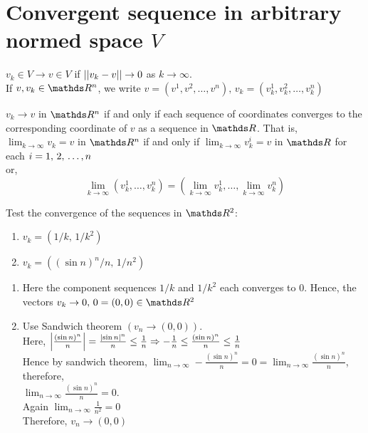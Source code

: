 \documentclass[../main-sheet.tex]{subfiles}
\begin{document}
\section{Convergent sequence in arbitrary normed space $ V $}   
$ v_k\in V\to v\in V $ if $ \left\vert\left\vert v_k-v\right\vert\right\vert\to 0 $ as $ k\to \infty $.\\
If $ v,v_k\in \R^n $, we write $ v=(v^1,v^2,\dots,v^n),\,v_k=(v^1_k,v^2_k,\dots,v_k^n) $
\newpage
\begin{thm}
    $ v_k\to v $ in $ \R^n $ if and only if each sequence of coordinates converges to the corresponding coordinate of $ v $ as a sequence in $ \R $. That is,\\
    $ \lim_{k\to \infty} v_k=v$ in $ \R^n $ if and only if $ \lim_{k\to \infty} v_k^i=v $ in $ \R $ for each $ i=1,\,2,\,\dots,n $\\
    or,\[\lim_{k\to \infty} (v_k^1,\dots,v_k^n)= \left(\lim_{k\to \infty}v_k^1,\dots,\lim_{k\to \infty}v_k^n\right)\]
\end{thm}
\begin{ex}
    Test the convergence of the sequences in $ \R^2 $:
    \begin{enumerate}[label=(\roman*)]
        \item $ v_k=(1/k,\,1/k^2) $
        \item $ v_k=\left((\sin n)^n /n,\,1/n^2\right) $
    \end{enumerate}
\end{ex}
\begin{soln}
    \hfill
    \begin{enumerate}[label=(\roman*)]
        \item Here the component sequences $ 1/k $ and $ 1/k^2 $ each converges to 0. Hence, the vectors $ v_k\to0,\, 0=(0,0)\in\R^2$
        \item Use Sandwich theorem $ \left(v_n\to (0,0)\right) $.\\
        Here, $ \left\vert\frac{(\sin n)^n}{n}\right\vert=\frac{\left\vert\sin n\right\vert^n}{n}\leq \frac{1}{n}\Rightarrow -\frac{1}{n}\leq \frac{(\sin n)^n}{n} \leq \frac{1}{n}$\\
        Hence by sandwich theorem, $ \lim_{n\to\infty} -\frac{(\sin n)^n}{n}=0=\lim_{n\to\infty}\frac{(\sin n)^n}{n}$, therefore,\\
        $ \lim_{n\to\infty}\frac{(\sin n)^n}{n}=0 $.\\
        Again $ \lim_{n\to\infty} \frac{1}{n^2}=0 $\\
        Therefore, $ v_n\to (0,0) $
    \end{enumerate}
\end{soln}
\end{document}
